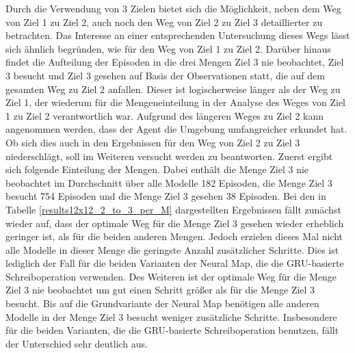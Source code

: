 Durch die Verwendung von 3 Zielen bietet sich die Möglichkeit, neben dem Weg von Ziel 1 zu Ziel 2, auch noch den Weg von Ziel 2 zu Ziel 3 detaillierter zu betrachten. Das Interesse an einer entsprechenden Untersuchung dieses Wegs lässt sich ähnlich begründen, wie für den Weg von Ziel 1 zu Ziel 2. Darüber hinaus findet die Aufteilung der Episoden in die drei Mengen \glqq Ziel 3 nie beobachtet\grqq{}, \glqq Ziel 3 besucht\grqq{} und \glqq Ziel 3 gesehen\grqq{} auf Basis der Observationen statt, die auf dem gesamten Weg zu Ziel 2 anfallen. Dieser ist logischerweise länger als der Weg zu Ziel 1, der wiederum für die Mengeneinteilung in der Analyse des Weges von Ziel 1 zu Ziel 2 verantwortlich war. Aufgrund des längeren Weges zu Ziel 2 kann angenommen werden, dass der Agent die Umgebung umfangreicher erkundet hat. Ob sich dies auch in den Ergebnissen für den Weg von Ziel 2 zu Ziel 3 niederschlägt, soll im Weiteren versucht werden zu beantworten. Zuerst ergibt sich folgende Einteilung der Mengen. Dabei enthält die Menge \glqq Ziel 3 nie beobachtet\grqq{} im Durchschnitt über alle Modelle 182 Episoden, die Menge \glqq Ziel 3 besucht\grqq{} 754 Episoden und die Menge \glqq Ziel 3 gesehen\grqq{} 38 Episoden. Bei den in Tabelle \ref{results12x12_2_to_3_per_M} dargestellten Ergebnissen fällt zunächst wieder auf, dass der optimale Weg für die Menge \glqq Ziel 3 gesehen\grqq{} wieder erheblich geringer ist, als für die beiden anderen Mengen. Jedoch erzielen dieses Mal nicht alle Modelle in dieser Menge die geringste Anzahl zusätzlicher Schritte. Dies ist lediglich der Fall für die beiden Varianten der Neural Map, die die GRU-basierte Schreiboperation verwenden. Des Weiteren ist der optimale Weg für die Menge \glqq Ziel 3 nie beobachtet\grqq{} um gut einen Schritt größer als für die Menge \glqq Ziel 3 besucht\grqq{}. Bis auf die Grundvariante der Neural Map benötigen alle anderen Modelle in der Menge \glqq Ziel 3 besucht\grqq{} weniger zusätzliche Schritte. Insbesondere für die beiden Varianten, die die GRU-basierte Schreiboperation benutzen, fällt der Unterschied sehr deutlich aus.


